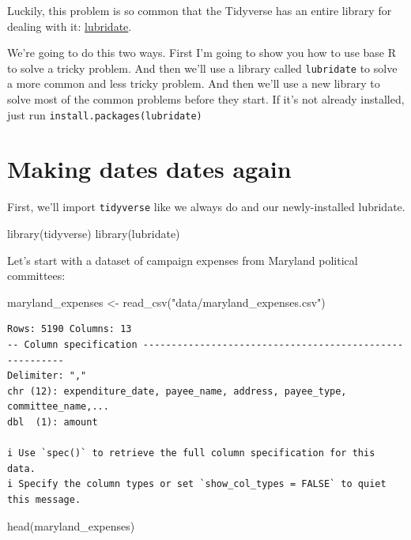 \documentclass[
  letterpaper,
  DIV=11,
  numbers=noendperiod]{scrreprt}
\newenvironment{Shaded}{\begin{snugshade}}{\end{snugshade}}
\newcommand{\FunctionTok}[1]{\textcolor[rgb]{0.28,0.35,0.67}{#1}}
\newcommand{\NormalTok}[1]{\textcolor[rgb]{0.00,0.23,0.31}{#1}}
\newcommand{\OtherTok}[1]{\textcolor[rgb]{0.00,0.23,0.31}{#1}}
\newcommand{\StringTok}[1]{\textcolor[rgb]{0.13,0.47,0.30}{#1}}
\begin{document}
Luckily, this problem is so common that the Tidyverse has an entire
library for dealing with it:
\href{https://lubridate.tidyverse.org/}{lubridate}.

We're going to do this two ways. First I'm going to show you how to use
base R to solve a tricky problem. And then we'll use a library called
\texttt{lubridate} to solve a more common and less tricky problem. And
then we'll use a new library to solve most of the common problems before
they start. If it's not already installed, just run
\texttt{install.packages(\textquotesingle{}lubridate\textquotesingle{})}

\hypertarget{making-dates-dates-again}{%
\section{Making dates dates again}\label{making-dates-dates-again}}

First, we'll import \texttt{tidyverse} like we always do and our
newly-installed lubridate.

\begin{Shaded}
\begin{Highlighting}[]
\FunctionTok{library}\NormalTok{(tidyverse)}
\FunctionTok{library}\NormalTok{(lubridate)}
\end{Highlighting}
\end{Shaded}

Let's start with a dataset of campaign expenses from Maryland political
committees:

\begin{Shaded}
\begin{Highlighting}[]
\NormalTok{maryland\_expenses }\OtherTok{\textless{}{-}} \FunctionTok{read\_csv}\NormalTok{(}\StringTok{"data/maryland\_expenses.csv"}\NormalTok{)}
\end{Highlighting}
\end{Shaded}

\begin{verbatim}
Rows: 5190 Columns: 13
-- Column specification --------------------------------------------------------
Delimiter: ","
chr (12): expenditure_date, payee_name, address, payee_type, committee_name,...
dbl  (1): amount

i Use `spec()` to retrieve the full column specification for this data.
i Specify the column types or set `show_col_types = FALSE` to quiet this message.
\end{verbatim}

\begin{Shaded}
\begin{Highlighting}[]
\FunctionTok{head}\NormalTok{(maryland\_expenses)}
\end{Highlighting}
\end{Shaded}
\end{document}
